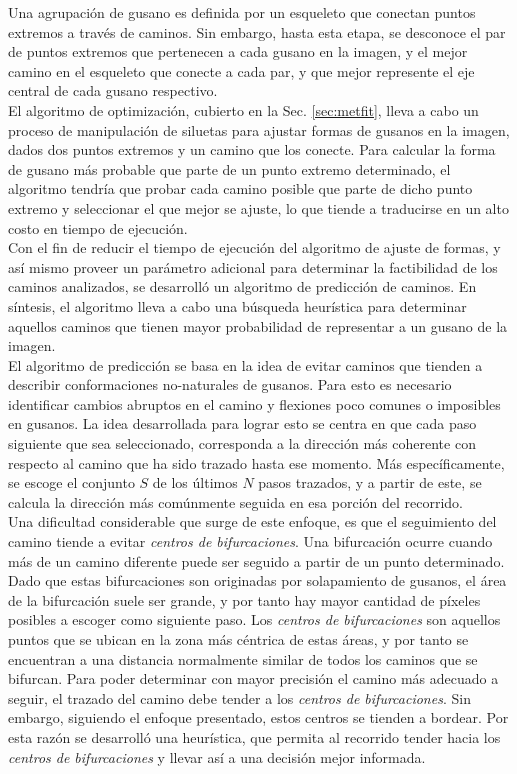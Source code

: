 Una agrupaci\'on de gusano es definida por un esqueleto
que conectan puntos extremos a trav\'es de caminos. Sin embargo, hasta esta etapa,
se desconoce el par de puntos extremos que pertenecen a cada gusano en la imagen, y 
el mejor camino en el esqueleto
que conecte a cada par, y que mejor represente el eje central de cada gusano 
respectivo.\\

El algoritmo de optimizaci\'on, cubierto en la Sec. \ref{sec:metfit}, lleva a cabo un
proceso de manipulaci\'on de siluetas para ajustar formas de gusanos en la imagen, dados
dos puntos extremos y un camino que los conecte. Para calcular la forma de gusano m\'as probable
que parte de un punto extremo determinado, el algoritmo tendr\'ia que probar cada camino posible
que parte de dicho punto extremo y seleccionar el que mejor se ajuste, lo que tiende a traducirse  
en un alto costo en tiempo de ejecuci\'on.\\
Con el fin de reducir el tiempo de ejecuci\'on del algoritmo de ajuste de
formas, y as\'i mismo proveer un par\'ametro adicional para determinar la
factibilidad de los caminos analizados, se desarroll\'o un algoritmo de
predicci\'on de caminos. En s\'intesis, el algoritmo lleva a cabo una b\'usqueda
heur\'istica para determinar aquellos caminos que tienen mayor probabilidad
de representar a un gusano de la imagen.\\

El algoritmo de predicci\'on se basa en la idea de evitar caminos que
tienden a describir conformaciones no-naturales de gusanos. Para esto
es necesario identificar cambios abruptos en el camino y flexiones
poco comunes o imposibles en gusanos. La idea desarrollada para lograr
esto se centra en que cada paso siguiente que sea seleccionado, corresponda
a la direcci\'on m\'as coherente con respecto al camino que ha sido
trazado hasta ese momento. 
M\'as espec\'ificamente, se escoge el conjunto $S$ de los \'ultimos $N$ 
pasos trazados, y a partir de este, se calcula la direcci\'on m\'as com\'unmente
seguida en esa porci\'on del recorrido.\\

Una dificultad considerable que surge de este
enfoque, es que el seguimiento del camino tiende a evitar \emph{centros de bifurcaciones}.
Una bifurcaci\'on ocurre cuando m\'as de un camino diferente puede ser seguido a partir
de un punto determinado. Dado que estas bifurcaciones son originadas por solapamiento 
de gusanos, el \'area de la bifurcaci\'on suele ser grande, y por tanto hay mayor 
cantidad de p\'ixeles posibles a escoger como siguiente paso. Los \emph{centros de bifurcaciones}
son aquellos puntos que se ubican en la zona m\'as c\'entrica de estas \'areas, y por tanto
se encuentran a una distancia normalmente similar de todos los caminos que se bifurcan.
Para poder determinar con mayor precisi\'on el camino m\'as adecuado a seguir, el trazado del camino 
debe tender a los \emph{centros de bifurcaciones}. Sin embargo, siguiendo el enfoque presentado, estos
centros se tienden a bordear. Por esta raz\'on se desarroll\'o una heur\'istica, que permita
al recorrido tender hacia los \emph{centros de bifurcaciones} y llevar as\'i a una 
decisi\'on mejor informada.\\

